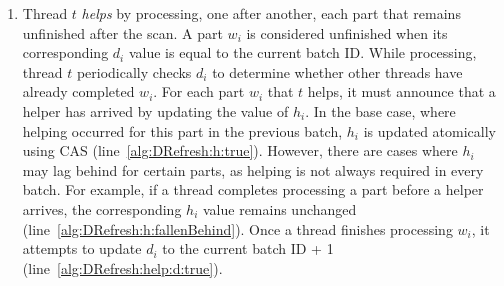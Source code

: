 {\begin{enumerate}
        \item Thread $t$ {\em helps} by processing, one after another, each part that remains unfinished  
        after the scan. A part $w_i$ is considered unfinished when its corresponding $d_i$ value  
        is equal to the current batch ID. While processing, thread $t$ periodically checks $d_i$  
        to determine whether other threads have already completed $w_i$. For each part $w_i$ that $t$
        helps, it must announce that a helper has arrived by updating the value of $h_i$.  
        In the base case, where helping occurred for this part in the previous batch, $h_i$ is updated
        atomically using CAS (line~\ref{alg:DRefresh:h:true}). However, there are cases where $h_i$
        may lag behind for certain parts, as helping is not always required in every batch. For example,
        if a thread completes processing a part before a helper arrives, the corresponding $h_i$ value
        remains unchanged (line~\ref{alg:DRefresh:h:fallenBehind}). Once a thread finishes processing
        $w_i$, it attempts to update $d_i$ to the current batch ID + 1 
        (line~\ref{alg:DRefresh:help:d:true}).  
    \end{enumerate}
    
}